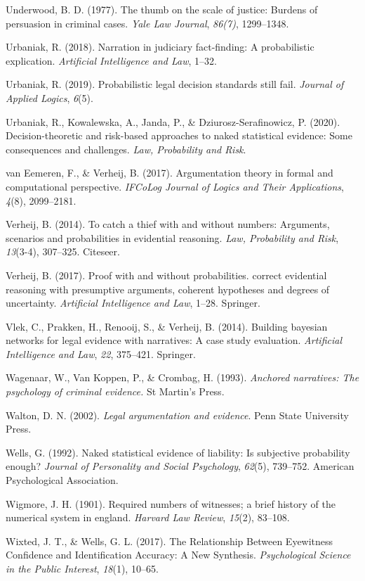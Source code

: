 \documentclass[11pt,dvipsnames,enabledeprecatedfontcommands]{scrartcl}
\begin{document}
\hypertarget{ref-Underwood1977The-thumb-on-th}{}
Underwood, B. D. (1977). The thumb on the scale of justice: Burdens of
persuasion in criminal cases. \emph{Yale Law Journal}, \emph{86(7)},
1299--1348.

\hypertarget{ref-urbaniak2018narration}{}
Urbaniak, R. (2018). Narration in judiciary fact-finding: A
probabilistic explication. \emph{Artificial Intelligence and Law},
1--32.

\hypertarget{ref-Urbaniak2019standards2}{}
Urbaniak, R. (2019). Probabilistic legal decision standards still fail.
\emph{Journal of Applied Logics}, \emph{6}(5).

\hypertarget{ref-Urbaniak2020Decision}{}
Urbaniak, R., Kowalewska, A., Janda, P., \& Dziurosz-Serafinowicz, P.
(2020). Decision-theoretic and risk-based approaches to naked
statistical evidence: Some consequences and challenges. \emph{Law,
Probability and Risk}.

\hypertarget{ref-vanEemeren2017}{}
van Eemeren, F., \& Verheij, B. (2017). Argumentation theory in formal
and computational perspective. \emph{IFCoLog Journal of Logics and Their
Applications}, \emph{4}(8), 2099--2181.

\hypertarget{ref-verheij2014catch}{}
Verheij, B. (2014). To catch a thief with and without numbers:
Arguments, scenarios and probabilities in evidential reasoning.
\emph{Law, Probability and Risk}, \emph{13}(3-4), 307--325. Citeseer.

\hypertarget{ref-verheijproof2017}{}
Verheij, B. (2017). Proof with and without probabilities. correct
evidential reasoning with presumptive arguments, coherent hypotheses and
degrees of uncertainty. \emph{Artificial Intelligence and Law}, 1--28.
Springer.

\hypertarget{ref-vlek2014building}{}
Vlek, C., Prakken, H., Renooij, S., \& Verheij, B. (2014). Building
bayesian networks for legal evidence with narratives: A case study
evaluation. \emph{Artificial Intelligence and Law}, \emph{22}, 375--421.
Springer.

\hypertarget{ref-wagenaar1993anchored}{}
Wagenaar, W., Van Koppen, P., \& Crombag, H. (1993). \emph{Anchored
narratives: The psychology of criminal evidence.} St Martin's Press.

\hypertarget{ref-Walton2002}{}
Walton, D. N. (2002). \emph{Legal argumentation and evidence}. Penn
State University Press.

\hypertarget{ref-wells1992naked}{}
Wells, G. (1992). Naked statistical evidence of liability: Is subjective
probability enough? \emph{Journal of Personality and Social Psychology},
\emph{62}(5), 739--752. American Psychological Association.

\hypertarget{ref-wigmore1901number}{}
Wigmore, J. H. (1901). Required numbers of witnesses; a brief history of
the numerical system in england. \emph{Harvard Law Review},
\emph{15}(2), 83--108.

\hypertarget{ref-wixted2017RelationshipEyewitnessConfidence}{}
Wixted, J. T., \& Wells, G. L. (2017). The Relationship Between
Eyewitness Confidence and Identification Accuracy: A New Synthesis.
\emph{Psychological Science in the Public Interest}, \emph{18}(1),
10--65.
\end{document}
